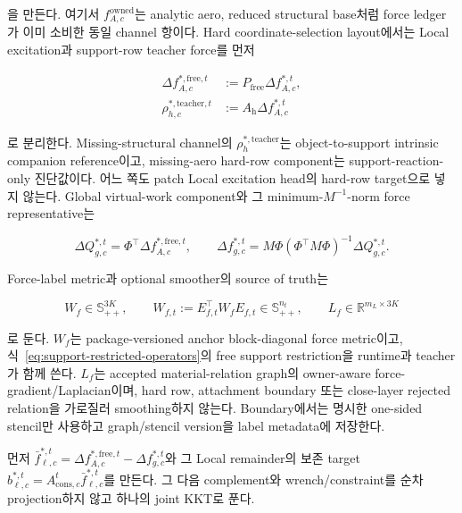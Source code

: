 \documentclass[11pt,a4paper]{article}
\newcommand{\R}{\mathbb{R}}
\begin{document}
을 만든다. 여기서 \(f_{A,c}^{\mathrm{owned}}\)는 analytic aero, reduced structural base처럼
force ledger가 이미 소비한 동일 channel 항이다.
Hard coordinate-selection layout에서는 Local excitation과 support-row teacher force를 먼저

\begin{equation}
\begin{aligned}
  \Delta f_{A,c}^{*,\mathrm{free},t}
  &:={}P_{\mathrm{free}}\Delta f_{A,c}^{*,t},\\
  \rho_{h,c}^{*,\mathrm{teacher},t}
  &:={}A_{\mathrm h}\Delta f_{A,c}^{*,t}
  \label{eq:teacher-hard-free-force-split}
\end{aligned}
\end{equation}

로 분리한다. Missing-structural channel의 \(\rho_h^{*,\mathrm{teacher}}\)는
object-to-support intrinsic companion reference이고, missing-aero hard-row component는
support-reaction-only 진단값이다. 어느 쪽도 patch Local excitation head의 hard-row target으로 넣지 않는다.
Global virtual-work component와 그 minimum-\(M^{-1}\)-norm force representative는

\begin{equation}
  \Delta Q_{g,c}^{*,t}=\Phi^\top\Delta f_{A,c}^{*,\mathrm{free},t},
  \qquad
  \Delta f_{g,c}^{*,t}
  =M\Phi(\Phi^\top M\Phi)^{-1}\Delta Q_{g,c}^{*,t}.
\end{equation}

Force-label metric과 optional smoother의 source of truth는

\begin{equation}
  W_f\in\mathbb S_{++}^{3K},
  \qquad
  W_{f,t}:=E_{f,t}^\top W_fE_{f,t}\in\mathbb S_{++}^{n_t},
  \qquad
  L_f\in\R^{m_L\times3K}
  \label{eq:force-label-metric-smoother}
\end{equation}

로 둔다. \(W_f\)는 package-versioned anchor block-diagonal force metric이고,
식~\eqref{eq:support-restricted-operators}의 free support restriction을 runtime과 teacher가 함께 쓴다.
\(L_f\)는 accepted material-relation graph의 owner-aware force-gradient/Laplacian이며,
hard row, attachment boundary 또는 close-layer rejected relation을 가로질러 smoothing하지 않는다.
Boundary에서는 명시한 one-sided stencil만 사용하고 graph/stencil version을 label metadata에 저장한다.

먼저 \(\bar f_{\ell,c}^{*,t}=\Delta f_{A,c}^{*,\mathrm{free},t}-\Delta f_{g,c}^{*,t}\)와
그 Local remainder의 보존 target
\(b_{\ell,c}^{*,t}=A_{\mathrm{cons},c}^t\bar f_{\ell,c}^{*,t}\)를 만든다.
그 다음 complement와 wrench/constraint를 순차 projection하지 않고 하나의 joint KKT로 푼다.
\end{document}
